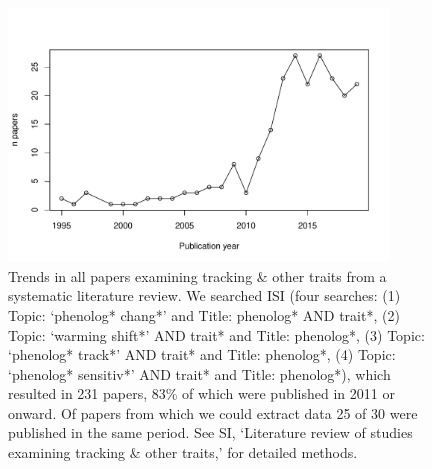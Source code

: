 \documentclass[11pt,letterpaper]{article}
\begin{document}
\begin{figure}[h!]
\centering
\includegraphics[width=0.9\textwidth]{..//..//..//..//R/graphs/otherdat/papersovertime.pdf}
\caption{Trends in all papers examining tracking \& other traits from a systematic literature review. We searched ISI (four searches: (1) Topic: `phenolog* chang*' and Title: phenolog* AND trait*, (2) Topic: `warming shift*' AND trait* and Title: phenolog*, (3) Topic: `phenolog* track*' AND trait* and Title: phenolog*, (4) Topic: `phenolog* sensitiv*' AND trait* and Title: phenolog*), which resulted in 231 papers, 83\% of which were published in 2011 or onward. Of papers from which we could extract data 25 of 30 were published in the same period. See SI, `Literature review of studies examining tracking \& other traits,' for detailed methods. }
  \label{fig:papertrends}
\end{figure}
\end{document}

